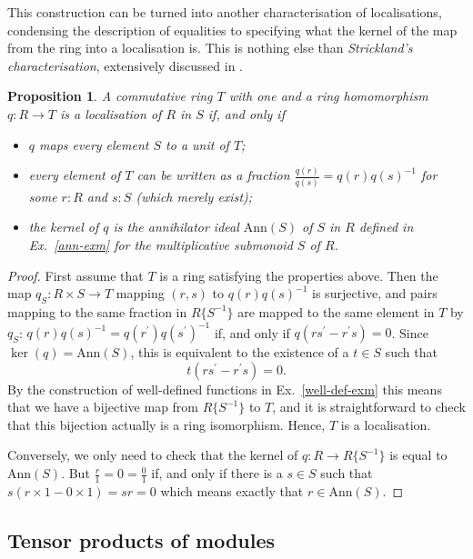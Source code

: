 \documentclass{amsart}
\theoremstyle{plain}
\numberwithin{equation}{section} %
\numberwithin{figure}{section} %
\theoremstyle{plain}
\theoremstyle{plain}
\theoremstyle{plain}
\theoremstyle{plain}
\theoremstyle{plain}
\newtheorem{prop}[thm]{Proposition} %
\theoremstyle{plain}
\theoremstyle{remark}
\theoremstyle{remark}
\theoremstyle{remark}
\begin{document}
This construction can be turned into another characterisation of localisations, condensing the description of equalities to specifying what the kernel of the map from the ring into a localisation is. This is nothing else than \textit{Strickland's characterisation}, extensively discussed in \cite{BHL+22, Buz24}.
\begin{prop} \label{Strickland-prop}
A commutative ring $T$ with one and a ring homomorphism $q : R \rightarrow T$ is a localisation of $R$ in $S$ if, and only if
\begin{itemize}
\item $q$ maps every element $S$ to a unit of $T$;
\item every element of $T$ can be written as a fraction $\frac{q(r)}{q(s)} = q(r)q(s)^{-1}$ for some $r : R$ and $s : S$ (which merely exist);
\item the kernel of $q$ is the annihilator ideal $\mathrm{Ann}(S)$ of $S$ in $R$ defined in Ex.~\ref{ann-exm} for the multiplicative submonoid $S$ of $R$.
\end{itemize} 
\end{prop}
\begin{proof}
First assume that $T$ is a ring satisfying the properties above. Then the map $q_S : R \times S \rightarrow T$ mapping $(r,s)$ to $q(r)q(s)^{-1}$ is surjective, and pairs mapping to the same fraction in $R\{S^{-1}\}$ are mapped to the same element in $T$ by $q_S$: $q(r)q(s)^{-1} = q(r^\prime)q(s^\prime)^{-1}$ if, and only if $q(rs^\prime - r^\prime s) = 0$. Since $\ker(q) = \mathrm{Ann}(S)$, this is equivalent to the existence of a $t \in S$ such that 
\[ t(rs^\prime - r^\prime s) = 0. \]
By the construction of well-defined functions in Ex.~\ref{well-def-exm} this means that we have a bijective map from $R\{S^{-1}\}$ to $T$, and it is straightforward to check that this bijection actually is a ring isomorphism. Hence, $T$ is a localisation.

Conversely,  we only need to check that the kernel of $q: R \rightarrow R\{S^{-1}\}$ is equal to $\mathrm{Ann}(S)$. But $\frac{r}{1} = 0 = \frac{0}{1}$ if, and only if there is a $s \in S$ such that $s(r \times 1 - 0 \times 1) = sr = 0$ which means exactly that $r \in \mathrm{Ann}(S)$. 
\end{proof}

\subsection{Tensor products of modules} \label{tensor-ssec}
\end{document}
